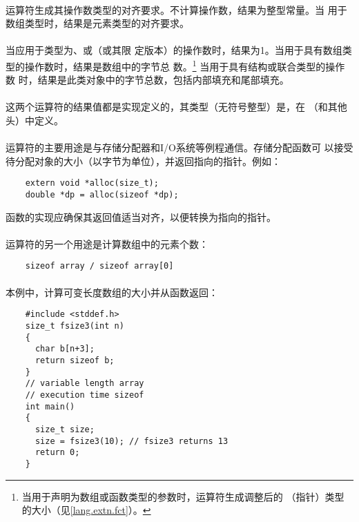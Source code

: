 {\paragraph{}
运算符生成其操作数类型的对齐要求。不计算操作数，结果为整型常量。当
用于数组类型时，结果是元素类型的对齐要求。

\paragraph{}
当应用于类型为、或（或其限
定版本）的操作数时，结果为1。当用于具有数组类型的操作数时，结果是数组中的字节总
数。\footnote{当用于声明为数组或函数类型的参数时，运算符生成调整后的
（指针）类型的大小（见\ref{lang.extn.fct}）。} 当用于具有结构或联合类型的操作数
时，结果是此类对象中的字节总数，包括内部填充和尾部填充。

\paragraph{}
这两个运算符的结果值都是实现定义的，其类型（无符号整型）是，在
（和其他头）中定义。

\paragraph{}
\ex {}运算符的主要用途是与存储分配器和I/O系统等例程通信。存储分配函数可
以接受待分配对象的大小（以字节为单位），并返回指向的指针。例如：
\begin{lstlisting}
    extern void *alloc(size_t);
    double *dp = alloc(sizeof *dp);
\end{lstlisting}
函数的实现应确保其返回值适当对齐，以便转换为指向的指针。

\paragraph{}
\ex {}运算符的另一个用途是计算数组中的元素个数：
\begin{lstlisting}
    sizeof array / sizeof array[0]
\end{lstlisting}

\paragraph{}
\ex 本例中，计算可变长度数组的大小并从函数返回：
\begin{lstlisting}
    #include <stddef.h>
    size_t fsize3(int n)
    {
      char b[n+3];
      return sizeof b;
    }
    // variable length array
    // execution time sizeof
    int main()
    {
      size_t size;
      size = fsize3(10); // fsize3 returns 13
      return 0;
    }
\end{lstlisting}

}
